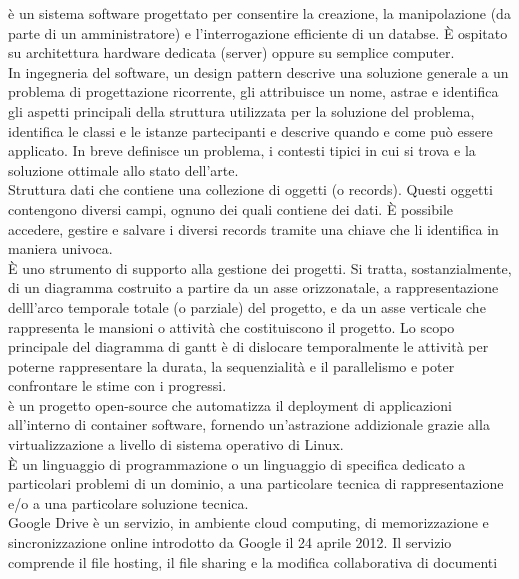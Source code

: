 \documentclass{scalatekids-article}
\begin{document}
 è un sistema software progettato per consentire la creazione, la manipolazione (da parte di un amministratore) e l'interrogazione efficiente di un databse.
È ospitato su architettura hardware dedicata (server) oppure su semplice computer.
\\

 In ingegneria del software, un design pattern descrive una soluzione generale a un problema di progettazione ricorrente, gli attribuisce un nome, astrae e identifica gli aspetti principali della struttura utilizzata per la soluzione del problema, identifica le classi e le istanze partecipanti e descrive quando e come può essere applicato. In breve definisce un problema, i contesti tipici in cui si trova e la soluzione ottimale allo stato dell'arte.
\\

 Struttura dati che contiene una collezione di oggetti (o records).
Questi oggetti contengono diversi campi, ognuno dei quali contiene dei dati.
È possibile accedere, gestire e salvare i diversi records tramite una chiave che li identifica in maniera univoca.
\\

 È uno strumento di supporto alla gestione dei progetti.
Si tratta, sostanzialmente, di un diagramma costruito a partire da un asse orizzonatale, a rappresentazione delll'arco temporale totale (o parziale) del progetto, e da un asse verticale che rappresenta le mansioni o attività che costituiscono il progetto.
Lo scopo principale del diagramma di gantt è di dislocare temporalmente le attività per poterne rappresentare la durata, la sequenzialità e il parallelismo e poter confrontare le stime con i progressi.
\\

 è un progetto open-source che automatizza il deployment di applicazioni all'interno di container software, fornendo un'astrazione addizionale grazie alla virtualizzazione a livello di sistema operativo di Linux.
\\

 È un linguaggio di programmazione o un linguaggio di specifica dedicato a particolari problemi di un dominio, a una particolare tecnica di rappresentazione e/o a una particolare soluzione tecnica.
\\

 Google Drive è un servizio, in ambiente cloud computing, di memorizzazione e sincronizzazione online introdotto da Google il 24 aprile 2012. Il servizio comprende il file hosting, il file sharing e la modifica collaborativa di documenti 
\\
\end{document}
